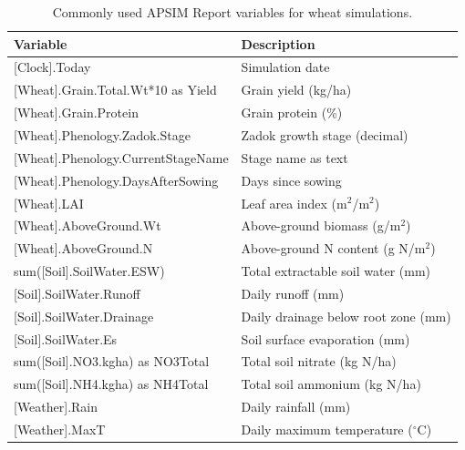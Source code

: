 \begin{table}[H]
\centering
\caption{Commonly used APSIM Report variables for wheat simulations.}
\label{tab:varquickref}
\renewcommand{\arraystretch}{1.3}
\begin{tabularx}{\textwidth}{>{\ttfamily\small}p{7.8cm} X}
\toprule
\normalfont\textbf{Variable} & \textbf{Description} \\
\midrule
{[Clock].Today}                              & Simulation date \\
{[Wheat].Grain.Total.Wt*10 as Yield}         & Grain yield (kg/ha) \\
{[Wheat].Grain.Protein}                      & Grain protein (\%) \\
{[Wheat].Phenology.Zadok.Stage}              & Zadok growth stage (decimal) \\
{[Wheat].Phenology.CurrentStageName}         & Stage name as text \\
{[Wheat].Phenology.DaysAfterSowing}          & Days since sowing \\
{[Wheat].LAI}                                & Leaf area index (m$^2$/m$^2$) \\
{[Wheat].AboveGround.Wt}                     & Above-ground biomass (g/m$^2$) \\
{[Wheat].AboveGround.N}                      & Above-ground N content (g N/m$^2$) \\
{sum([Soil].SoilWater.ESW)}                  & Total extractable soil water (mm) \\
{[Soil].SoilWater.Runoff}                    & Daily runoff (mm) \\
{[Soil].SoilWater.Drainage}                  & Daily drainage below root zone (mm) \\
{[Soil].SoilWater.Es}                        & Soil surface evaporation (mm) \\
{sum([Soil].NO3.kgha) as NO3Total}           & Total soil nitrate (kg N/ha) \\
{sum([Soil].NH4.kgha) as NH4Total}           & Total soil ammonium (kg N/ha) \\
{[Weather].Rain}                             & Daily rainfall (mm) \\
{[Weather].MaxT}                             & Daily maximum temperature ($^\circ$C) \\
\bottomrule
\end{tabularx}
\end{table}

